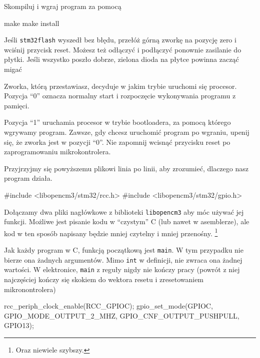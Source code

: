 \documentclass{pdfBooklets}
\begin{document}
Skompiluj i wgraj program za pomocą

\begin{CodeFrame*}[bash]{}
make
make install
\end{CodeFrame*}

Jeśli \Verb$stm32flash$ wyszedł bez błędu, przełóż górną zworkę na pozycję zero i wciśnij przycisk reset. Możesz też odłączyć i podłączyć ponownie
zasilanie do płytki. Jeśli wszystko poszło dobrze, zielona dioda na płytce powinna zacząć migać


\begin{ProTip}{}
  Zworka, którą przestawiasz, decyduje w jakim trybie uruchomi się procesor. Pozycja ``0'' oznacza normalny start i rozpoczęcie
  wykonywania programu z pamięci.
  
  Pozycja ``1'' uruchamia procesor w trybie bootloadera, za pomocą którego wgrywamy program. Zawsze, gdy chcesz uruchomić program po
  wgraniu, upenij się, że zworka jest w pozycji ``0''. Nie zapomnij wcisnąć przycisku reset po zaprogramowaniu mikrokontrolera.
\end{ProTip}



Przyjrzyjmy się powyższemu plikowi linia po linii, aby zrozumieć, dlaczego nasz program działa.


\begin{CodeFrame*}[c]{}
#include <libopencm3/stm32/rcc.h>
#include <libopencm3/stm32/gpio.h>

\end{CodeFrame*}

Dołączamy dwa pliki nagłówkowe z biblioteki \Verb$libopencm3$ aby móc używać jej funkcji. Możliwe jest pisanie kodu w ``czystym'' C
(lub nawet w asemblerze), ale kod w ten sposób napisany będzie mniej czytelny i mniej przenośny.
\footnote{Oraz niewiele szybszy.}

\begin{CodeFrame*}[c]{}
int main() { 
\end{CodeFrame*}

Jak każdy program w C, funkcją początkową jest \verb$main$. W tym przypadku nie bierze ona żadnych argumentów. Mimo \Verb$int$ w
definicji, nie zwraca ona żadnej wartości. W elektronice, \Verb$main$ z reguły nigdy nie kończy pracy (powrót z niej najczęściej
kończy się skokiem do wektora resetu i zresetowaniem mikronontrolera)

\begin{CodeFrame*}[c]{}
  rcc_periph_clock_enable(RCC_GPIOC);
  gpio_set_mode(GPIOC, GPIO_MODE_OUTPUT_2_MHZ,
		GPIO_CNF_OUTPUT_PUSHPULL, GPIO13);
\end{CodeFrame*}
\end{document}
